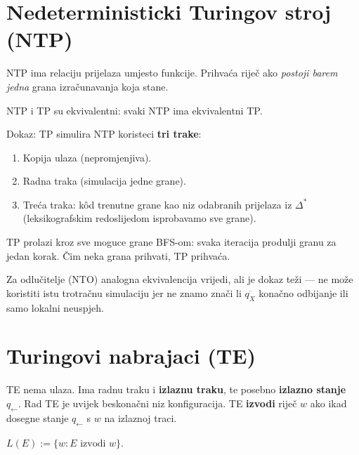 \section{Nedeterministicki Turingov stroj (NTP)}

\begin{definicija}
NTP ima relaciju prijelaza umjesto funkcije. Prihvaća riječ
ako \emph{postoji barem jedna} grana izračunavanja koja stane.
\end{definicija}

\begin{propozicija}
NTP i TP su ekvivalentni: svaki NTP ima ekvivalentni TP.
\end{propozicija}

Dokaz: TP simulira NTP koristeci \textbf{tri trake}:
\begin{enumerate}
  \item Kopija ulaza (nepromjenjiva).
  \item Radna traka (simulacija jedne grane).
  \item Treća traka: kôd trenutne grane kao niz odabranih prijelaza
        iz $\Delta^*$ (leksikografskim redoslijedom isprobavamo sve grane).
\end{enumerate}
TP prolazi kroz sve moguce grane BFS-om: svaka iteracija produlji
granu za jedan korak. Čim neka grana prihvati, TP prihvaća.

\begin{napomena}
Za odlučitelje (NTO) analogna ekvivalencija vrijedi, ali je dokaz
teži --- ne može koristiti istu trotračnu simulaciju jer ne znamo
znači li $\overline{q_X}$ konačno odbijanje ili samo lokalni neuspjeh.
\end{napomena}

\section{Turingovi nabrajaci (TE)}

\begin{definicija}
TE nema ulaza. Ima radnu traku i \textbf{izlaznu traku}, te posebno
\textbf{izlazno stanje} $q_\leftarrow$. Rad TE je uvijek beskonačni niz
konfiguracija. TE \textbf{izvodi} riječ $w$ ako ikad dosegne stanje
$q_\leftarrow$ s $w$ na izlaznoj traci.

$L(E) := \{w : E \text{ izvodi } w\}$.
\end{definicija}


